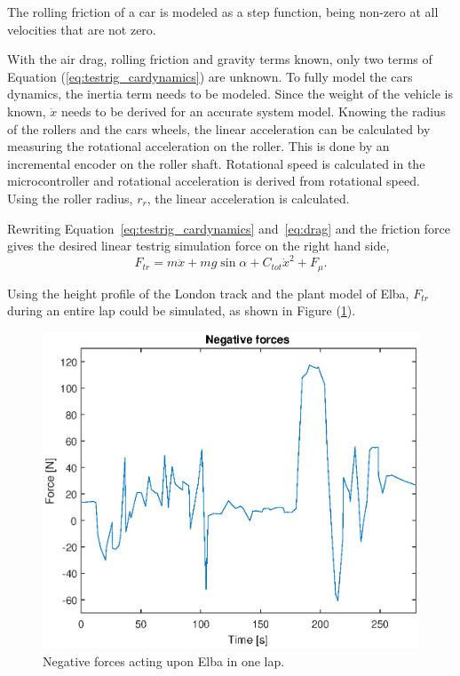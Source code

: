 The rolling friction of a car is modeled as a step function, being non-zero at
all velocities that are not zero.

With the air drag, rolling friction and gravity terms known, only two terms of
Equation (\ref{eq:testrig_cardynamics}) are unknown. To fully model the cars
dynamics, the inertia term needs to be modeled. Since the weight of the vehicle
is known, $\ddot{x}$ needs to be derived for an accurate system model.
Knowing the radius of the rollers and the cars wheels, the linear acceleration
can be calculated by measuring the rotational acceleration on the roller. This
is done by an incremental encoder on the roller shaft. Rotational speed is
calculated in the microcontroller and rotational acceleration is derived from
rotational speed. Using the roller radius, $r_{r}$, the linear acceleration
is calculated.

Rewriting Equation~\ref{eq:testrig_cardynamics} and~\ref{eq:drag} and the friction force gives the
desired linear testrig simulation force on the right hand side,
\begin{equation} \label{eq:simulationforce}
    F_{tr} = m\ddot{x} + mg\sin{\alpha} + C_{tot}\dot{x}^2 + F_{\mu}.
\end{equation}

Using the height profile of the London track and the plant model of Elba, $F_{tr}$ during an entire lap could be simulated, as shown in Figure (\ref{fig:testrig_negative_forces}).

\begin{figure}[H]
    \centering
    \includegraphics[width=\textwidth]{./img/testrig_negative_forces.eps}
    \caption{Negative forces acting upon Elba in one lap.}\label{fig:testrig_negative_forces}
\end{figure}

